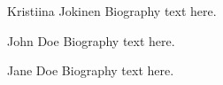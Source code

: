 \documentclass[10pt,journal,compsoc]{IEEEtran}
\begin{document}
\begin{IEEEbiography}{Kristiina Jokinen}
Biography text here.
\end{IEEEbiography}

\begin{IEEEbiographynophoto}{John Doe}
Biography text here.
\end{IEEEbiographynophoto}


\begin{IEEEbiographynophoto}{Jane Doe}
Biography text here.
\end{IEEEbiographynophoto}






\end{document}
